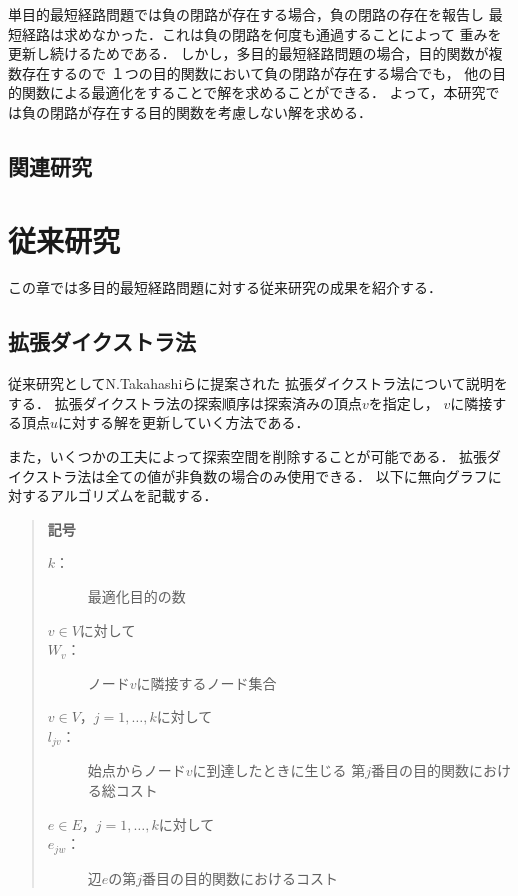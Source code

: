 \documentclass[12pt]{optlab-bachelor}
\begin{document}
単目的最短経路問題では負の閉路が存在する場合，負の閉路の存在を報告し
最短経路は求めなかった．これは負の閉路を何度も通過することによって
重みを更新し続けるためである．
しかし，多目的最短経路問題の場合，目的関数が複数存在するので
１つの目的関数において負の閉路が存在する場合でも，
他の目的関数による最適化をすることで解を求めることができる．
よって，本研究では負の閉路が存在する目的関数を考慮しない解を求める．


\section{関連研究}



\chapter{従来研究}
この章では多目的最短経路問題に対する従来研究の成果を紹介する．

\section{拡張ダイクストラ法}
従来研究としてN.Takahashiら\cite{N.TAKAHASHI1}に提案された
拡張ダイクストラ法について説明をする．
拡張ダイクストラ法の探索順序は探索済みの頂点$v$を指定し，
$v$に隣接する頂点$u$に対する解を更新していく方法である．

また，いくつかの工夫によって探索空間を削除することが可能である．
拡張ダイクストラ法は全ての値が非負数の場合のみ使用できる．
以下に無向グラフに対するアルゴリズムを記載する．

\begin{quote}
  \textbf{記号}
  \begin{description}
    \item[$k$：] 最適化目的の数
    \item[$v \in V$に対して]
    \item[$W_v$：] ノード$v$に隣接するノード集合
    \item[$v \in V$，$j = 1 , \ldots , k$に対して]
    \item[$l_{jv}$：] 始点からノード$v$に到達したときに生じる
    第$j$番目の目的関数における総コスト
    \item[$e \in E$，$j = 1 , \ldots , k$に対して]
    \item[$e_{jw}$：] 辺$e$の第$j$番目の目的関数におけるコスト
  \end{description}
\end{quote}
\end{document}
